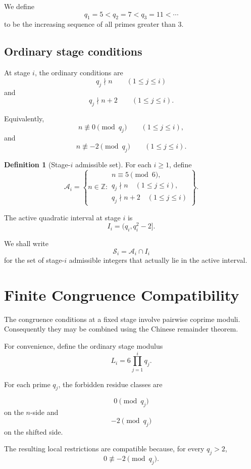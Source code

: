 \documentclass[11pt,a4paper]{article}
\theoremstyle{definition}
\newtheorem{definition}[theorem]{Definition}
\theoremstyle{remark}
\newcommand{\ZZ}{\mathbb{Z}}
\newcommand{\Scal}{\mathcal{S}}
\newcommand{\Acal}{\mathcal{A}}
\begin{document}
We define
\[
    q_1=5<q_2=7<q_3=11<\cdots
\]
to be the increasing sequence of all primes greater than $3$.

\subsection{Ordinary stage conditions}

At stage $i$, the ordinary conditions are
\[
    q_j\nmid n
    \qquad(1\le j\le i)
\]
and
\[
    q_j\nmid n+2
    \qquad(1\le j\le i).
\]

Equivalently,
\[
    n\not\equiv0\pmod{q_j}
    \qquad(1\le j\le i),
\]
and
\[
    n\not\equiv-2\pmod{q_j}
    \qquad(1\le j\le i).
\]


\begin{definition}[Stage-$i$ admissible set]
For each $i\ge1$, define
\[
\Acal_i
=
\left\{
n\in\ZZ:
\begin{array}{l}
n\equiv5\pmod6,\\
q_j\nmid n\quad(1\le j\le i),\\
q_j\nmid n+2\quad(1\le j\le i)
\end{array}
\right\}.
\]
\end{definition}

The active quadratic interval at stage $i$ is
\[
    I_i=(q_i,q_i^2-2].
\]

We shall write
\[
    \Scal_i=\Acal_i\cap I_i
\]
for the set of stage-$i$ admissible integers that actually lie in the
active interval.



\section{Finite Congruence Compatibility}

The congruence conditions at a fixed stage involve pairwise coprime
moduli.  Consequently they may be combined using the Chinese remainder
theorem.

For convenience, define the ordinary stage modulus
\[
    L_i
    =
    6\prod_{j=1}^{i}q_j.
\]

For each prime $q_j$, the forbidden residue classes are

\[
    0\pmod{q_j}
\]
on the $n$-side and
\[
    -2\pmod{q_j}
\]
on the shifted side.

The resulting local restrictions are compatible because, for every
$q_j>2$,
\[
    0\not\equiv-2\pmod{q_j}.
\]
\end{document}
